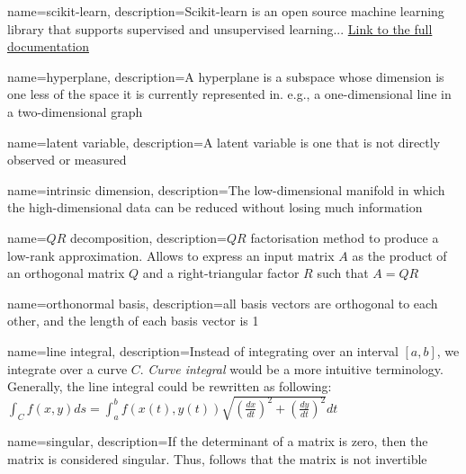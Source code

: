 

{
    name=scikit-learn,
    description={Scikit-learn is an open source machine learning library that supports supervised and unsupervised learning... \href{https://scikit-learn.org/stable/getting_started.html}{Link to the full documentation}}
}

{
    name=hyperplane,
    description={A hyperplane is a subspace whose dimension is one less of the space it is currently represented in. e.g., a one-dimensional line in a two-dimensional graph}
}

{
    name=latent variable,
    description={A latent variable is one that is not directly observed or measured \cite{rosipal2005overview}}
}

{
    name=intrinsic dimension,
    description={The low-dimensional manifold in which the high-dimensional data can be reduced without losing much information \cite{GeometricStructureWangCh1}}
}

{
    name=$QR$ decomposition,
    description={$QR$ factorisation method to produce a low-rank approximation. Allows to express an input matrix $A$ as the product of an orthogonal matrix $Q$ and a right-triangular factor $R$ such that $A = QR$ \cite{duersch2017randomized}}
}

{
    name=orthonormal basis,
    description={all basis vectors are orthogonal to each other, and the length of each basis vector is 1 \cite{deisenroth2020mathematics}}
}

{
    name=line integral,
    description={Instead of integrating over an interval $[a,b]$, we integrate over a curve $C$.
    \emph{Curve integral} would be a more intuitive terminology. Generally, the line integral could be rewritten as following:\medskip
    \\
    $\int_C f(x,y) ds = \int_a^b f(x(t), y(t)) \sqrt{(\frac{dx}{dt})^2 + (\frac{dy}{dt})^2} dt$
    \quad \cite{stewart2016calculus}}
}

{
    name=singular,
    description={If the determinant of a matrix is zero, then the matrix is considered singular. Thus, follows that the matrix is not invertible}
}

